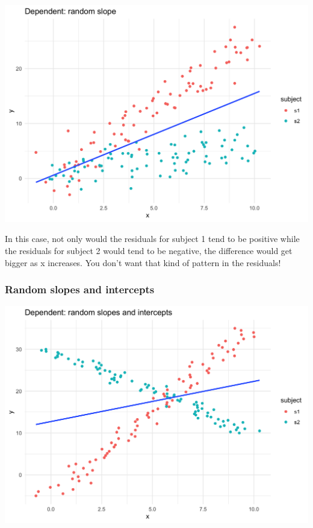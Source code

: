 \documentclass[
  openany]{book}
\begin{document}
\begin{center}\includegraphics[width=1\linewidth]{images/m3/rand_slope} \end{center}

In this case, not only would the residuals for subject 1 tend to be positive while the residuals for subject 2 would tend to be negative, the difference would get bigger as x increases. You don't want that kind of pattern in the residuals!

\hypertarget{random-slopes-and-intercepts}{%
\subsubsection{Random slopes and intercepts}\label{random-slopes-and-intercepts}}

\begin{center}\includegraphics[width=1\linewidth]{images/m3/rand_slope_int} \end{center}
\end{document}
